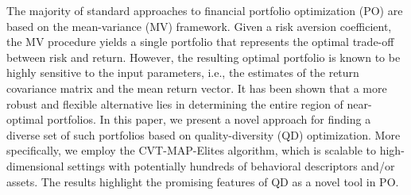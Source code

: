 The majority of standard approaches to financial portfolio optimization (PO) are based on the mean-variance (MV) framework. Given a risk aversion coefficient, the MV procedure yields a single portfolio that represents the optimal trade-off between risk and return. However, the resulting optimal portfolio is known to be highly sensitive to the input parameters, i.e., the estimates of the return covariance matrix and the mean return vector. It has been shown that a more robust and flexible alternative lies in determining the entire region of near-optimal portfolios. In this paper, we present a novel approach for finding a diverse set of such portfolios based on quality-diversity (QD) optimization. More specifically, we employ the CVT-MAP-Elites algorithm, which is scalable to high-dimensional settings with potentially hundreds of behavioral descriptors and/or assets. The results highlight the promising features of QD as a novel tool in PO.

